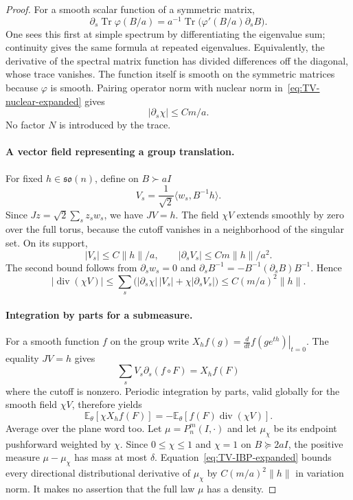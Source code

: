 \documentclass[11pt]{article}
\theoremstyle{definition}\newtheorem{definition}[theorem]{Definition}
\theoremstyle{remark}\newtheorem{remark}[theorem]{Remark}
\DeclareMathOperator{\Tr}{Tr}
\DeclareMathOperator{\diver}{div}
\newcommand{\E}{\mathbb E}
\newcommand{\g}{\mathfrak{so}(n)}
\begin{document}
\begin{proof}
For a smooth scalar function of a symmetric matrix,
\[
 \partial_s\Tr\varphi(B/a)
 =a^{-1}\Tr\bigl(\varphi'(B/a)\partial_sB\bigr).
\]
One sees this first at simple spectrum by differentiating the eigenvalue sum; continuity gives the same formula at repeated eigenvalues. Equivalently, the derivative of the spectral matrix function has divided differences off the diagonal, whose trace vanishes. The function itself is smooth on the symmetric matrices because $\varphi$ is smooth. Pairing operator norm with nuclear norm in~\eqref{eq:TV-nuclear-expanded} gives
\begin{equation}\label{eq:TV-cutoff-derivative-expanded}
 |\partial_s\chi|\le Cm/a.
\end{equation}
No factor $N$ is introduced by the trace.

\paragraph{A vector field representing a group translation.}
For fixed $h\in\g$, define on $B\succ aI$
\[
 V_s=\frac1{\sqrt2}\langle w_s,B^{-1}h\rangle.
\]
Since $Jz=\sqrt2\sum_s z_sw_s$, we have $JV=h$. The field $\chi V$ extends smoothly by zero over the full torus, because the cutoff vanishes in a neighborhood of the singular set. On its support,
\[
 |V_s|\le C\|h\|/a,
 \qquad
 |\partial_sV_s|\le Cm\|h\|/a^2.
\]
The second bound follows from $\partial_sw_s=0$ and
$\partial_sB^{-1}=-B^{-1}(\partial_sB)B^{-1}$. Hence
\begin{equation}\label{eq:TV-divergence-expanded}
 |\diver(\chi V)|
 \le\sum_s\bigl(|\partial_s\chi|\,|V_s|+\chi|\partial_sV_s|\bigr)
 \le C(m/a)^2\|h\|.
\end{equation}

\paragraph{Integration by parts for a submeasure.}
For a smooth function $f$ on the group write
$X_hf(g)=\left.\frac{d}{dt}f(ge^{th})\right|_{t=0}$. The equality $JV=h$ gives
\[
 \sum_s V_s\partial_s(f\circ F)=X_hf(F)
\]
where the cutoff is nonzero. Periodic integration by parts, valid globally for the smooth field $\chi V$, therefore yields
\begin{equation}\label{eq:TV-IBP-expanded}
 \E_\theta[\chi X_hf(F)]
 =-\E_\theta[f(F)\diver(\chi V)].
\end{equation}
Average over the plane word too. Let $\mu=P_n^m(I,\cdot)$ and let $\mu_\chi$ be its endpoint pushforward weighted by $\chi$. Since $0\le\chi\le1$ and $\chi=1$ on $B\succeq2aI$, the positive measure $\mu-\mu_\chi$ has mass at most $\delta$. Equation~\eqref{eq:TV-IBP-expanded} bounds every directional distributional derivative of $\mu_\chi$ by $C(m/a)^2\|h\|$ in variation norm. It makes no assertion that the full law $\mu$ has a density.


\end{proof}
\end{document}
